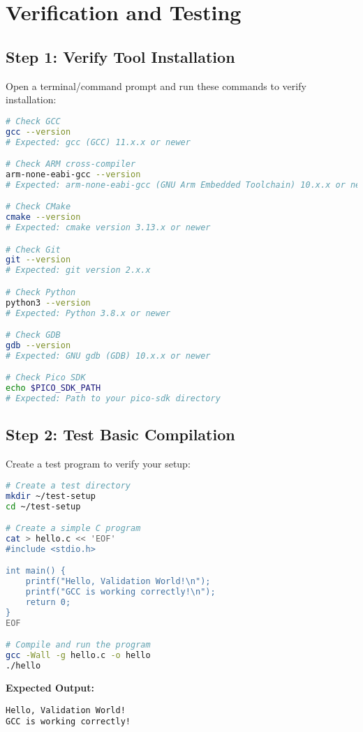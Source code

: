 \documentclass[11pt,a4paper]{article}
\begin{document}
\section{Verification and Testing}

\subsection{Step 1: Verify Tool Installation}
Open a terminal/command prompt and run these commands to verify installation:

\begin{lstlisting}[language=bash]
# Check GCC
gcc --version
# Expected: gcc (GCC) 11.x.x or newer

# Check ARM cross-compiler
arm-none-eabi-gcc --version
# Expected: arm-none-eabi-gcc (GNU Arm Embedded Toolchain) 10.x.x or newer

# Check CMake
cmake --version
# Expected: cmake version 3.13.x or newer

# Check Git
git --version
# Expected: git version 2.x.x

# Check Python
python3 --version
# Expected: Python 3.8.x or newer

# Check GDB
gdb --version
# Expected: GNU gdb (GDB) 10.x.x or newer

# Check Pico SDK
echo $PICO_SDK_PATH
# Expected: Path to your pico-sdk directory
\end{lstlisting}

\subsection{Step 2: Test Basic Compilation}
Create a test program to verify your setup:

\begin{lstlisting}[language=bash]
# Create a test directory
mkdir ~/test-setup
cd ~/test-setup

# Create a simple C program
cat > hello.c << 'EOF'
#include <stdio.h>

int main() {
    printf("Hello, Validation World!\n");
    printf("GCC is working correctly!\n");
    return 0;
}
EOF

# Compile and run the program
gcc -Wall -g hello.c -o hello
./hello
\end{lstlisting}

\textbf{Expected Output:}
\begin{verbatim}
Hello, Validation World!
GCC is working correctly!
\end{verbatim}
\end{document}
